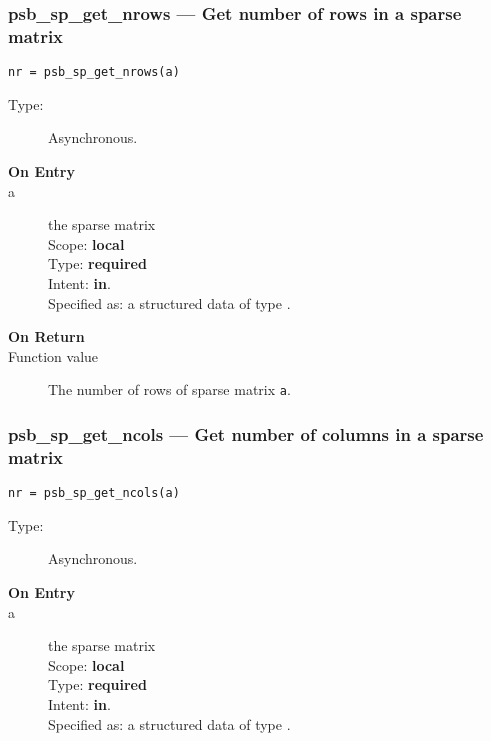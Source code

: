 \subsubsection*{psb\_sp\_get\_nrows --- Get number of  rows in a sparse
  matrix}

\begin{verbatim}
nr = psb_sp_get_nrows(a)
\end{verbatim}

\begin{description}
\item[Type:] Asynchronous.
\item[\bf On Entry]
\item[a] the sparse matrix\\
Scope: {\bf local}\\
Type: {\bf required}\\
Intent: {\bf in}.\\
Specified as: a structured data of type \spdata.
\end{description}

\begin{description}
\item[\bf On Return]
\item[Function value] The number of  rows  of sparse matrix \verb|a|.
\end{description}


\subsubsection*{psb\_sp\_get\_ncols --- Get number of  columns in a
  sparse matrix}

\begin{verbatim}
nr = psb_sp_get_ncols(a)
\end{verbatim}

\begin{description}
\item[Type:] Asynchronous.
\item[\bf On Entry]
\item[a] the sparse matrix\\
Scope: {\bf local}\\
Type: {\bf required}\\
Intent: {\bf in}.\\
Specified as: a structured data of type \spdata.
\end{description}

